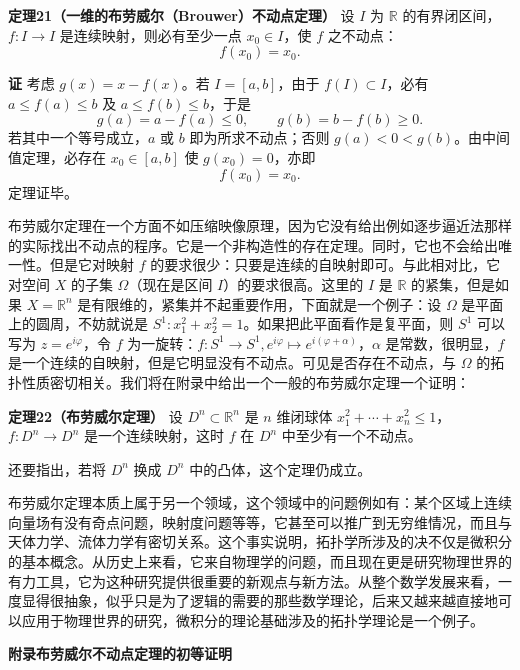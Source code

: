 \noindent\textbf{定理21（一维的布劳威尔（Brouwer）不动点定理）}\quad
设 $I$ 为 $\mathbb R$ 的有界闭区间，$f:I\to I$ 是连续映射，则必有至少一点 $x_0\in I$，使 $f$ 之不动点：
\[
 f(x_0)=x_0.
\]

\noindent\textbf{证}\quad
考虑 $g(x)=x-f(x)$。若 $I=[a,b]$，由于 $f(I)\subset I$，必有 $a\le f(a)\le b$ 及 $a\le f(b)\le b$，于是
\[
 g(a)=a-f(a)\le0,\qquad g(b)=b-f(b)\ge0.
\]
若其中一个等号成立，$a$ 或 $b$ 即为所求不动点；否则 $g(a)<0<g(b)$。由中间值定理，必存在 $x_0\in[a,b]$ 使 $g(x_0)=0$，亦即
\[
 f(x_0)=x_0.
\]
定理证毕。

布劳威尔定理在一个方面不如压缩映像原理，因为它没有给出例如逐步逼近法那样的实际找出不动点的程序。它是一个非构造性的存在定理。同时，它也不会给出唯一性。但是它对映射 $f$ 的要求很少：只要是连续的自映射即可。与此相对比，它对空间 $X$ 的子集 $\Omega$（现在是区间 $I$）的要求很高。这里的 $I$ 是 $\mathbb R$ 的紧集，但是如果 $X=\mathbb R^n$ 是有限维的，紧集并不起重要作用，下面就是一个例子：设 $\Omega$ 是平面上的圆周，不妨就说是 $S^1:x_1^2+x_2^2=1$。如果把此平面看作是复平面，则 $S^1$ 可以写为 $z=e^{i\varphi}$，令 $f$ 为一旋转：$f:S^1\to S^1,e^{i\varphi}\mapsto e^{i(\varphi+\alpha)}$，$\alpha$ 是常数，很明显，$f$ 是一个连续的自映射，但是它明显没有不动点。可见是否存在不动点，与 $\Omega$ 的拓扑性质密切相关。我们将在附录中给出一个一般的布劳威尔定理一个证明：

\noindent\textbf{定理22（布劳威尔定理）}\quad
设 $D^n\subset\mathbb R^n$ 是 $n$ 维闭球体 $x_1^2+\cdots+x_n^2\le1$，$f:D^n\to D^n$ 是一个连续映射，这时 $f$ 在 $D^n$ 中至少有一个不动点。

还要指出，若将 $D^n$ 换成 $D^n$ 中的凸体，这个定理仍成立。

布劳威尔定理本质上属于另一个领域，这个领域中的问题例如有：某个区域上连续向量场有没有奇点问题，映射度问题等等，它甚至可以推广到无穷维情况，而且与天体力学、流体力学有密切关系。这个事实说明，拓扑学所涉及的决不仅是微积分的基本概念。从历史上来看，它来自物理学的问题，而且现在更是研究物理世界的有力工具，它为这种研究提供很重要的新观点与新方法。从整个数学发展来看，一度显得很抽象，似乎只是为了逻辑的需要的那些数学理论，后来又越来越直接地可以应用于物理世界的研究，微积分的理论基础涉及的拓扑学理论是一个例子。

\clearpage
\begin{center}
{\sffamily\bfseries\color{BellaBlue}\fontsize{18}{23}\selectfont 附录\quad 布劳威尔不动点定理的初等证明}
\end{center}
\vspace{1em}

